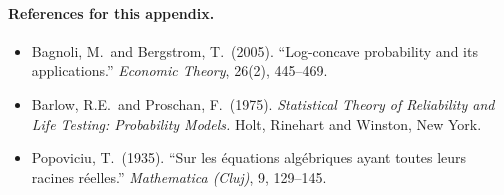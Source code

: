 \documentclass[12pt,a4paper]{article}
\theoremstyle{definition}
\theoremstyle{plain}
\theoremstyle{remark}
\begin{document}
\paragraph{References for this appendix.}

\begin{itemize}
  \item Bagnoli, M.\ and Bergstrom, T.\ (2005).
    ``Log-concave probability and its applications.''
    \emph{Economic Theory}, 26(2), 445--469.
  \item Barlow, R.E.\ and Proschan, F.\ (1975).
    \emph{Statistical Theory of Reliability and Life Testing:
    Probability Models.}
    Holt, Rinehart and Winston, New York.
  \item Popoviciu, T.\ (1935).
    ``Sur les \'equations alg\'ebriques ayant toutes leurs
    racines r\'eelles.''
    \emph{Mathematica (Cluj)}, 9, 129--145.
\end{itemize}
\end{document}
